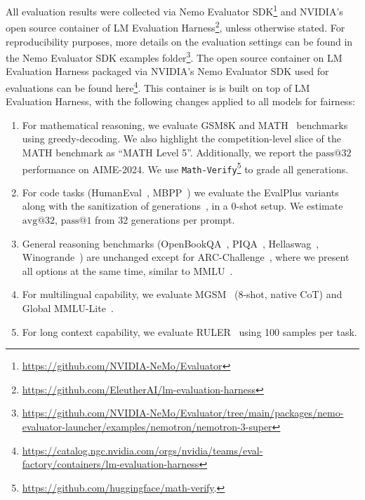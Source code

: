 All evaluation results were collected via Nemo Evaluator SDK\footnote{\url{https://github.com/NVIDIA-NeMo/Evaluator}} and NVIDIA's open source container of LM Evaluation Harness\footnote{\url{https://github.com/EleutherAI/lm-evaluation-harness}}, unless otherwise stated. For reproducibility purposes, more details on the evaluation settings can be found in the Nemo Evaluator SDK examples folder\footnote{\url{https://github.com/NVIDIA-NeMo/Evaluator/tree/main/packages/nemo-evaluator-launcher/examples/nemotron/nemotron-3-super}}. 
The open source container on LM Evaluation Harness packaged via NVIDIA's Nemo Evaluator SDK used for evaluations can be found here\footnote{\url{https://catalog.ngc.nvidia.com/orgs/nvidia/teams/eval-factory/containers/lm-evaluation-harness}}. This container is is built on top of LM Evaluation Harness, with the following changes applied to all models for fairness:
\begin{enumerate}
  \setlength{\itemsep}{0.4em}  
    \item For mathematical reasoning, we evaluate GSM8K and MATH~\citep{cobbe2021trainingverifierssolvemath, hendrycks2021measuringmathematicalproblemsolving} benchmarks using greedy-decoding. We also highlight the competition-level slice of the MATH benchmark as ``MATH Level 5''. Additionally, we report the $\text{pass}@32$ performance on AIME-2024. We use \texttt{Math-Verify}\footnote{\url{https://github.com/huggingface/math-verify}.} to grade all generations.
    \item For code tasks (HumanEval~\citep{chen2021evaluatinglargelanguagemodels}, MBPP~\citep{austin2021programsynthesislargelanguage}) we evaluate the EvalPlus variants along with the sanitization of generations~\citep{Liu_Is_Your_Code_2023}, in a 0-shot setup. We estimate $\text{avg}@32$,  $\text{pass}@1$ from 32 generations per prompt.
    \item General reasoning benchmarks (OpenBookQA~\citep{mihaylov2018suitarmorconductelectricity}, PIQA~\citep{bisk2019piqareasoningphysicalcommonsense}, Hellaswag~\citep{zellers2019hellaswagmachinereallyfinish}, Winogrande~\citep{sakaguchi2019winograndeadversarialwinogradschema}) are unchanged except for ARC-Challenge~\citep{Clark2018ThinkYH}, where we present all options at the same time, similar to MMLU~\citep{hendrycks2021measuringmassivemultitasklanguage}.
    \item For multilingual capability, we evaluate MGSM~\citep{shi2022languagemodelsmultilingualchainofthought} (8-shot, native CoT) and Global MMLU-Lite~\citep{singh2024globalmmluunderstandingaddressing}.
    \item For long context capability, we evaluate RULER~\citep{hsieh2024ruler} using 100 samples per task.
\end{enumerate}

